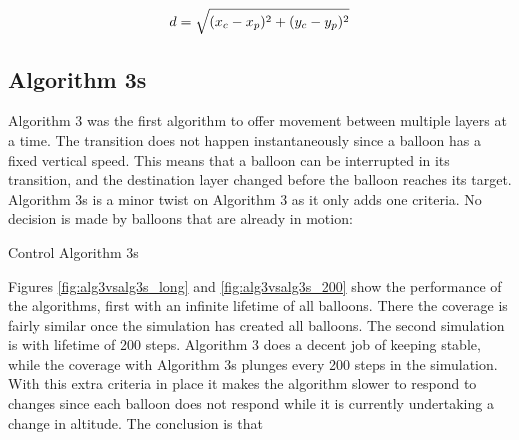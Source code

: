 \begin{align}
d = \sqrt{(x_c-x_p)^2+(y_c-y_p)^2} \notag
\end{align}

\subsection{Algorithm 3s}
Algorithm 3 was the first algorithm to offer movement between multiple layers at a time. The transition does not happen instantaneously since a balloon has a fixed vertical speed. This means that a balloon can be interrupted in its transition, and the destination layer changed before the balloon reaches its target. Algorithm 3s is a minor twist on Algorithm 3 as it only adds one criteria. No decision is made by balloons that are already in motion:

\begin{algorithm}[H]
\caption{Control Algorithm 3s}
\label{alg:3s}
\end{algorithm}

Figures \ref{fig:alg3vsalg3s_long} and \ref{fig:alg3vsalg3s_200} show the performance of the algorithms, first with an infinite lifetime of all balloons. There the coverage is fairly similar once the simulation has created all balloons. The second simulation is with lifetime of 200 steps. Algorithm 3 does a decent job of keeping stable, while the coverage with Algorithm 3s plunges every 200 steps in the simulation. With this extra criteria in place it makes the algorithm slower to respond to changes since each balloon does not respond while it is currently undertaking a change in altitude. The conclusion is that 

